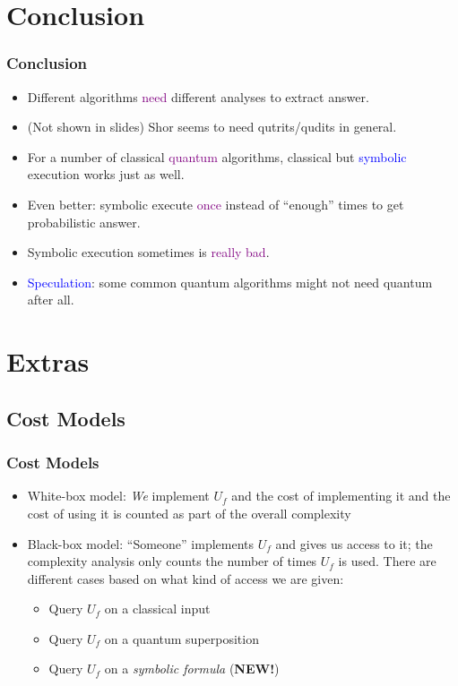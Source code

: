\documentclass{beamer}
\newcommand{\pub}[1]{\textcolor{purple}{#1}}
\newcommand{\blu}[1]{\textcolor{blue}{#1}}
\begin{document}
\section[Conclusion]{Conclusion}

\begin{frame}
  \frametitle{Conclusion}
  \begin{itemize}
    \item Different algorithms \pub{need} different analyses to extract answer.
    \item (Not shown in slides) Shor seems to need qutrits/qudits in general.
    \item For a number of classical \pub{quantum} algorithms, 
      classical but \blu{symbolic} execution works just as well.
    \item Even better: symbolic execute \pub{once} instead of ``enough'' times
      to get probabilistic answer.
    \item Symbolic execution sometimes is \pub{really bad}.
  \end{itemize}
  \pause
  \vspace*{5mm}
  \begin{itemize}
    \item \blu{Speculation}: some common quantum algorithms might not need
      quantum after all.
  \end{itemize}
\end{frame}


\section[Extras]{Extras}
\subsection[Cost Models]{Cost Models}

\begin{frame}
  \frametitle{Cost Models}
  \begin{itemize}
\item White-box model: \emph{We} implement $U_f$ and the cost of
  implementing it and the cost of using it is counted as part of the
  overall complexity
\item Black-box model: ``Someone'' implements $U_f$ and gives us
  access to it; the complexity analysis only counts the number of
  times $U_f$ is used. There are different cases based on what kind of
  access we are given:
  \begin{itemize}
    \item Query $U_f$ on a classical input 
    \item Query $U_f$ on a quantum superposition
    \item Query $U_f$ on a \emph{symbolic formula} (\textbf{NEW!})
  \end{itemize}
    \end{itemize}
  
\end{frame}
\end{document}
